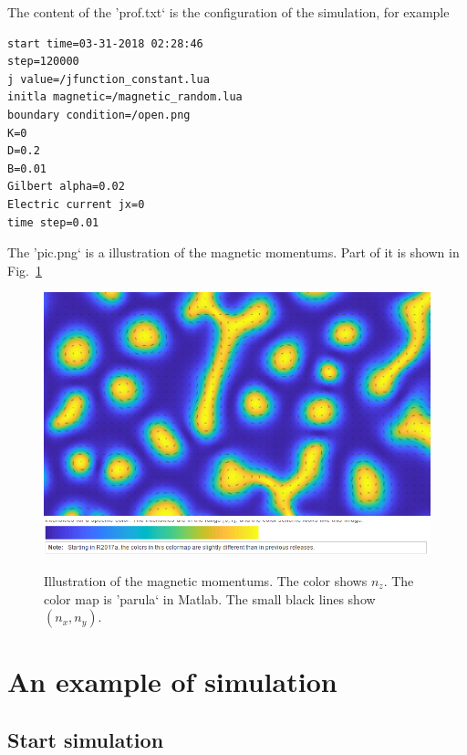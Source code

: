 \documentclass[aps,superscriptaddress,groupedaddress]{revtex4}  %
\begin{document}
The content of the 'prof.txt` is the configuration of the simulation, for example
\begin{lstlisting}
start time=03-31-2018 02:28:46
step=120000
j value=/jfunction_constant.lua
initla magnetic=/magnetic_random.lua
boundary condition=/open.png
K=0
D=0.2
B=0.01
Gilbert alpha=0.02
Electric current jx=0
time step=0.01
\end{lstlisting}

The 'pic.png` is a illustration of the magnetic momentums. Part of it is shown in Fig.~\ref{Fig:output2}
\begin{figure}
\includegraphics[scale=0.3]{output2.png}
\includegraphics[scale=0.5]{parula.png}
\caption{\label{Fig:output2}Illustration of the magnetic momentums. The color shows $n_z$. The color map is 'parula` in Matlab. The small black lines show $(n_x,n_y)$.}
\end{figure}

\section{\label{sec:7}An example of simulation}

\subsection{\label{sec:7.1}Start simulation}
\end{document}
